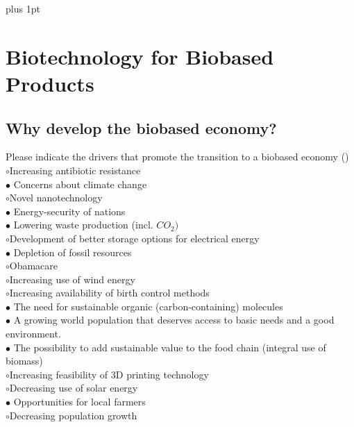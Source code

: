 \documentclass[]{beamer}
\begin{document}
\begin{CJK}{UTF8}{gbsn}
\parskip=1cm plus 1pt
\section{Biotechnology for Biobased Products}
\subsection{ Why develop the biobased economy?}
\setcounter{questions}{0}


\begin{frame}[shrink] {} 
\addtocounter{questions}{1}
\color{blue}
  Please indicate the drivers that promote the transition to a biobased economy
 ({})\\
\color{black}
\setlength{\parindent}{-0.4cm}
{\color{red}$\circ$}Increasing antibiotic resistance  \\
{\color{red}$\bullet$} Concerns about climate change  \\
{\color{red}$\circ$}Novel nanotechnology   \\
{\color{red}$\bullet$} Energy-security of nations  \\
{\color{red}$\bullet$} Lowering waste production (incl. $CO_{2})$   \\
{\color{red}$\circ$}Development of better storage options for electrical energy  \\
{\color{red}$\bullet$} Depletion of fossil resources   \\
{\color{red}$\circ$}Obamacare  \\
{\color{red}$\circ$}Increasing use of wind energy  \\
{\color{red}$\circ$}Increasing availability of birth control methods  \\
{\color{red}$\bullet$} The need for sustainable organic (carbon-containing) molecules  \\
{\color{red}$\bullet$} A growing world population that deserves access to basic needs and a good environment.  \\
{\color{red}$\bullet$} The possibility to add sustainable value to the food chain (integral use of biomass)  \\
{\color{red}$\circ$}Increasing feasibility of 3D printing technology  \\
{\color{red}$\circ$}Decreasing use of solar energy  \\
{\color{red}$\bullet$} Opportunities for local farmers  \\
{\color{red}$\circ$}Decreasing population growth  \\
\end{frame}



\end{CJK}
\end{document}
